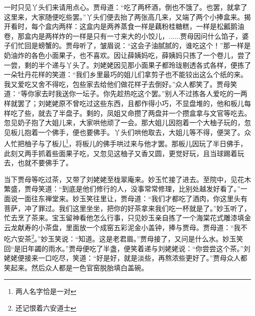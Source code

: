 \documentclass[12pt,oneside]{book}
\begin{document}
一时只见丫头们来请用点心。贾母道：“吃了两杯酒，倒也不饿了。也罢，就拿了这里来，大家随便吃些罢。”丫头们便去抬了两张高几来，又端了两个小捧盒来。揭开看时，每个盒内两样：这盒内是两养蒸食一样是藕粉桂糖糕，一样是松瓤鹅油卷，那盒内是两样炸的一样是只有一寸来大的小饺儿，......贾母因问什么馅子，婆子们忙回是螃蟹的。贾母听了，皱眉说：“这会子油腻腻的，谁吃这个！”那一样是奶油炸的各色小面果子，也不喜欢。因让薛姨妈吃，薛姨妈只拣了一个卷儿，尝了一尝，剩的半个递与丫头了。刘姥姥因见那小面果子都玲珑剔透各式各样，便拣了一朵牡丹花样的笑道：“我们乡里最巧的姐儿们拿剪子也不能铰出这么个纸的来。我又爱吃又舍不得吃，包些家去给他们做花样子去倒好。”众人都笑了。贾母笑道：“等你家去时我送你一坛子。你先趁热吃这个罢。”别人不过拣各人爱吃的一两样就罢了；刘姥姥原不曾吃过这些东西，且都作得小巧，不显盘堆的，他和板儿每样吃了些，就去了半盘子。剩的，凤姐又命攒了两盘并一个攒盒拿与文官等吃去。忽见奶子抱了大姐儿来，大家哄他顽了一会。那大姐儿因抱着一个大柚子玩的，忽见板儿抱着一个佛手，便也要佛手。丫头们哄他取去，大姐儿等不得，便哭了。众人忙把柚子与了板儿\footnote{两人名字恰是一对}，将板儿的佛手哄过来与他才罢。那板儿因玩了半日佛手，此刻又两手抓着些面果子吃，又忽见这柚子又香又圆，更觉好玩，且当球踢着玩去，也就不要佛手了。

当下贾母等吃过茶，又带了刘姥姥至栊翠庵来。妙玉忙接了进去。至院中，见花木繁盛，贾母笑道：“到底是他们修行的人，没事常常修理，比别处越发好看了。”一面说一面往东禅堂来。妙玉笑往里让，贾母道：“我们才都吃了酒肉，你这里头有菩萨，冲了罪过。我们这里坐坐，把你的好茶拿来我们吃一杯就是了。”妙玉听了，忙去烹了茶来。宝玉留神看他怎么行事，只见妙玉亲自拣了一个海棠花式雕漆填金云龙献寿的小茶盘，里面放一个成窑五彩泥金小盖钟，捧与贾母。贾母道：“我不吃六安茶\footnote{还记恨着六安道士}。”妙玉笑说：“知道。这是老君眉。”贾母接了，又问是什么水。妙玉笑回“是旧年蠲的雨水。”贾母便吃了半盏，便笑着递与刘姥姥说：“你尝尝这个茶。”刘姥姥便接来一口吃尽，笑道：“好是好，就是淡些，再熬浓些更好了。”贾母众人都笑起来。然后众人都是一色官窑脱胎填白盖碗。
\end{document}
